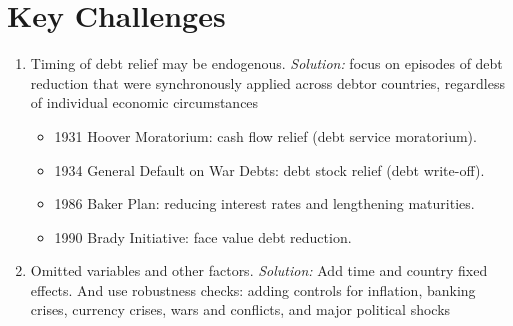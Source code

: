\section{Key Challenges}

\begin{enumerate}
    \item Timing of debt relief may be endogenous.
        \emph{Solution:} focus on episodes of debt reduction that were synchronously applied across debtor countries,
        regardless of individual economic circumstances
        \begin{itemize}
            \item 1931 Hoover Moratorium: cash flow relief (debt service moratorium).
            \item 1934 General Default on War Debts: debt stock relief (debt write-off).
            \item 1986 Baker Plan: reducing interest rates and lengthening maturities.
            \item 1990 Brady Initiative: face value debt reduction.
        \end{itemize}
    \item Omitted variables and other factors.
        \emph{Solution:} Add time and country fixed effects.
        And use robustness checks: adding controls for inflation, banking crises, currency crises, wars and conflicts, and major political shocks
\end{enumerate}


